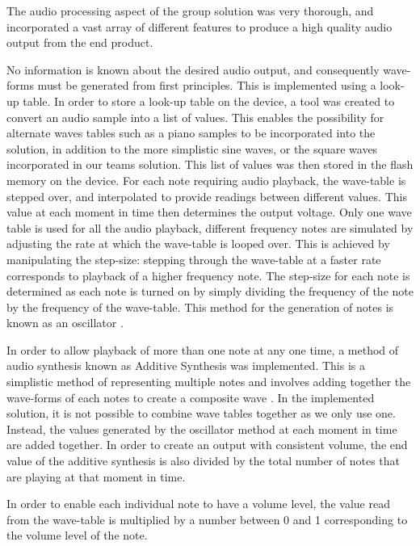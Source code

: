 The audio processing aspect of the group solution was very thorough, and 
incorporated a vast array of different features to produce a high quality audio
output from the end product.
\par\bigskip\noindent
No information is known about the desired audio output, and consequently 
wave-forms must be generated from first principles. 
This is implemented using a look-up table. 
In order to store a look-up table on the device, a tool was created to convert 
an audio sample into a list of values.
This enables the possibility for alternate waves tables such as a piano samples 
to be incorporated into the solution, in addition to the more simplistic sine 
waves, or the square waves incorporated in our teams solution.
This list of values was then stored in the flash memory on the device.
For each note requiring audio playback, the wave-table is stepped over, and 
interpolated to provide readings between different values. 
This value at each moment in time then determines the output voltage. 
Only one wave table is used for all the audio playback, different frequency notes are 
simulated by adjusting the rate at which the wave-table is looped over. This is 
achieved by manipulating the step-size: stepping through the wave-table at a 
faster rate corresponds to playback of a higher frequency note. The step-size 
for each note is determined as each note is turned on by simply dividing the 
frequency of the note by the frequency of the wave-table. This method for the 
generation of notes is known as an oscillator \cite{puckette2007theory}.
\par\bigskip\noindent
In order to allow playback of more than one note at any one time, a method of 
audio synthesis known as Additive Synthesis was implemented. This is a simplistic
method of representing multiple notes and involves adding together the 
wave-forms of each notes to create a composite wave \cite{miranda2012computer}. 
In the implemented solution, it is not possible to combine wave tables 
together as we only use one. Instead, the values generated by the oscillator 
method at each moment in time are added together. 
In order to create an output with consistent volume, the end value of the 
additive synthesis is also divided by the total number of notes that are playing 
at that moment in time. 
\par\bigskip\noindent
In order to enable each individual note to have a volume level, the 
value read from the wave-table is multiplied by a number between 0 and 1 
corresponding to the volume level of the note. 
